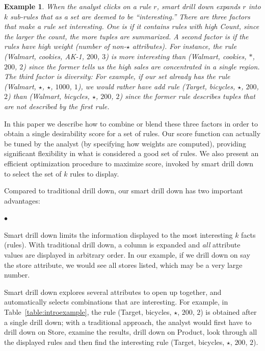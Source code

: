 \documentclass[10pt,journal,compsoc]{IEEEtran}
\newtheorem{example}[definition]{Example}
\newcommand{\squishlist}{
   \begin{list}{$\bullet$}
    { \setlength{\itemsep}{0pt}
      \setlength{\parsep}{2pt}
      \setlength{\topsep}{2pt}
      \setlength{\partopsep}{0pt}
    }
}
\newcommand{\squishend}{\end{list}}
\begin{document}
\begin{example}
When the analyst clicks on a rule $r$, smart drill down
expands $r$ into $k$ sub-rules that as a set are deemed to be ``interesting.''
There are three factors that make a rule set interesting.
One is if it contains rules with high Count,
since the larger the count, the more tuples are summarized.
A second factor is if the rules have high weight (number of non-$\star$ attributes).
For instance, the rule (Walmart, cookies, AK-1, $200$, $3$)
is more interesting than (Walmart, cookies, $*$, $200$, $2$)
since the former tells us the high sales are concentrated in a single region.
The third factor is diversity: For example, if our set already has the rule (Walmart, $\star$, $\star$, $1000$, $1$), 
we would rather have add rule (Target, bicycles, $\star$, $200$, $2$)
than (Walmart, bicycles, $\star$, $200$, $2$) since the former rule
describes tuples that are not described by the first rule.
\end{example}

In this paper we describe how to combine or blend these three factors
in order to obtain a single desirability score for a set of rules.
Our score function can actually be tuned by the analyst
(by specifying how weights are computed),
providing significant flexibility in what is considered a good set of rules.
We also present an efficient optimization procedure to maximize score, invoked
by smart drill down to select the set of $k$ rules to display.


 Compared to traditional drill down, our smart drill down has two important advantages:
\squishlist
\item
Smart drill down limits the information displayed
to the most interesting $k$ facts (rules).
With traditional drill down, a column is expanded and {\em all}
attribute values are displayed in arbitrary order.
In our example, if we drill down on say the store attribute,
we would see all stores listed, which may be a very large number.
\item
Smart drill down explores several attributes to open up together,
and automatically selects combinations that are interesting.
For example, in Table~\ref{table:introexample},
the rule (Target, bicycles, $\star$, $200$, $2$)
is obtained after a single drill down;
with a traditional approach, the analyst would first have to drill down on
Store, examine the results, drill down on Product,
look through all the displayed rules and then find the interesting rule
(Target, bicycles, $\star$, $200$, $2$).
\squishend
\end{document}
